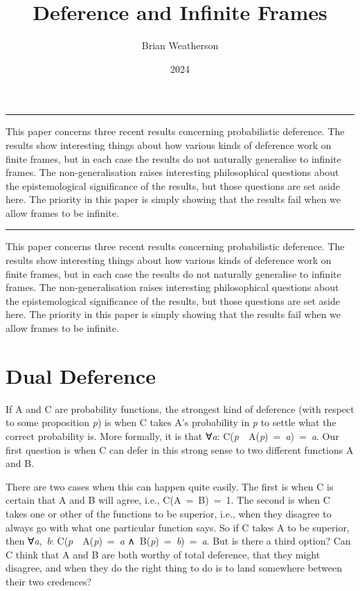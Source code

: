 \documentclass[
  10pt,
  letterpaper,
  DIV=11,
  numbers=noendperiod,
  twoside]{scrartcl}
\title{Deference and Infinite Frames}
\author{Brian Weatherson}
\date{2024}
\renewenvironment{abstract}
 {\vspace{-1.25cm}
 \quotation\small\noindent\rule{\linewidth}{.5pt}\par\smallskip
 \noindent }
 {\par\noindent\rule{\linewidth}{.5pt}\endquotation}
\begin{document}
\maketitle
\begin{abstract}
This paper concerns three recent results concerning probabilistic
deference. The results show interesting things about how various kinds
of deference work on finite frames, but in each case the results do not
naturally generalise to infinite frames. The non-generalisation raises
interesting philosophical questions about the epistemological
significance of the results, but those questions are set aside here. The
priority in this paper is simply showing that the results fail when we
allow frames to be infinite.
\end{abstract}

This paper concerns three recent results concerning probabilistic
deference. The results show interesting things about how various kinds
of deference work on finite frames, but in each case the results do not
naturally generalise to infinite frames. The non-generalisation raises
interesting philosophical questions about the epistemological
significance of the results, but those questions are set aside here. The
priority in this paper is simply showing that the results fail when we
allow frames to be infinite.

\section{Dual Deference}\label{dual-deference}

If A and C are probability functions, the strongest kind of deference
(with respect to some proposition \emph{p}) is when C takes A's
probability in \emph{p} to settle what the correct probability is. More
formally, it is that ∀\emph{a}:
C(\emph{p}~\textbar~A(\emph{p})~=~\emph{a})~=~\emph{a}. Our first
question is when C can defer in this strong sense to two different
functions A and B.

There are two cases when this can happen quite easily. The first is when
C is certain that A and B will agree, i.e., C(A~=~B)~=~1. The second is
when C takes one or other of the functions to be superior, i.e., when
they disagree to always go with what one particular function says. So if
C takes A to be superior, then ∀\emph{a},~\emph{b}:
C(\emph{p}~\textbar~A(\emph{p})~=~\emph{a}
∧~B(\emph{p})~=~\emph{b})~=~\emph{a}. But is there a third option? Can C
think that A and B are both worthy of total deference, that they might
disagree, and when they do the right thing to do is to land somewhere
between their two credences?
\end{document}
